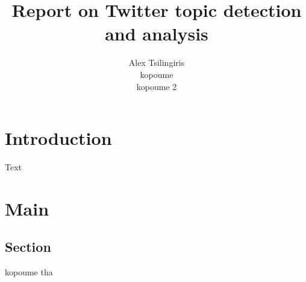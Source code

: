 \documentclass[12pt,svgnames]{report}
\title{Report on Twitter topic detection and analysis}
\author{
Alex Tsilingiris \\
kopoume \\
kopoume 2\\
}
\begin{document}
\maketitle
\tableofcontents
\chapter{Introduction}
Text
\chapter{Main}
\section{Section}
kopoume tha



\nocite{*}
\end{document}
